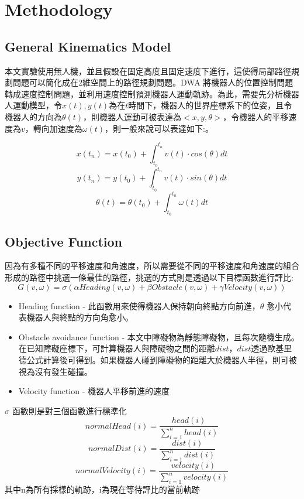 \documentclass[crop=false]{standalone}
\begin{document}
	\section{Methodology}
	\subsection{General Kinematics Model}
	本文實驗使用無人機，並且假設在固定高度且固定速度下進行，這使得局部路徑規劃問題可以簡化成在2維空間上的路徑規劃問題。DWA 將機器人的位置控制問題轉成速度控制問題，並利用速度控制預測機器人運動軌跡。為此，需要先分析機器人運動模型\cite{fox}，令$x(t), y(t)$為在$t$時間下，機器人的世界座標系下的位姿，且令機器人的方向為$\theta(t)$，則機器人運動可被表達為$<x, y, \theta>$，令機器人的平移速度為$v$，轉向加速度為$\omega(t)$，則一般來說可以表達如下:。
	
	\begin{equation}
		x(t_n)=x(t_0)+ \int_{t_0}^{t_n}v(t) \cdot cos(\theta)dt
	\end{equation}
	\begin{equation}
		y(t_n)=y(t_0)+ \int_{t_0}^{t_n}v(t) \cdot sin(\theta)dt
	\end{equation}
	\begin{equation}
		\theta(t)=\theta(t_0)+\int_{t_0}^{t_n}\omega(t)dt
	\end{equation}
	
	
	\subsection{Objective Function}
	因為有多種不同的平移速度和角速度，所以需要從不同的平移速度和角速度的組合形成的路徑中挑選一條最佳的路徑，挑選的方式則是透過以下目標函數進行評比:
	\begin{equation}
		G(v, \omega)=\sigma(\alpha Heading(v, \omega) + \beta Obstacle(v, \omega) + \gamma Velocity(v, \omega))
	\end{equation}
	\begin{itemize}
		\item Heading function - 此函數用來使得機器人保持朝向終點方向前進，$\theta$ 愈小代表機器人與終點的方向角愈小。
		\item Obstacle avoidance function - 本文中障礙物為靜態障礙物，且每次隨機生成。在已知障礙座標下，可計算機器人與障礙物之間的距離$dist$，$dist$透過歐基里德公式計算後可得到。如果機器人碰到障礙物的距離大於機器人半徑，則可被視為沒有發生碰撞。
		\item Velocity function - 機器人平移前進的速度
	\end{itemize}
	$\sigma$ 函數則是對三個函數進行標準化
	\begin{equation}
		normalHead(i)=\frac{head(i)}{\sum_{i=1}^{n}{head(i)}}
	\end{equation}
	\begin{equation}
		normalDist(i)=\frac{dist(i)}{\sum_{i=1}^{n}{dist(i)}}
	\end{equation}
	\begin{equation}
		normalVelocity(i)=\frac{velocity(i)}{\sum_{i=1}^{n}{velocity(i)}}
	\end{equation}
	其中n為所有採樣的軌跡，i為現在等待評比的當前軌跡
\end{document}
